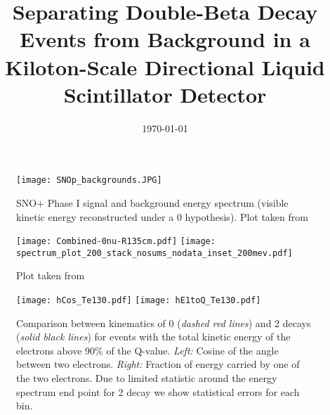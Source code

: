 



\graphicspath{{plots/}}

\linenumbers
{}

\title{Separating Double-Beta Decay Events from Background in a Kiloton-Scale Directional Liquid Scintillator Detector}


\begin{abstract}

\end{abstract}

\date{\today}

\maketitle

\newpage
\tableofcontents
\newpage

\linenumbers\relax %



\begin{figure}[ht]
  \centering
  \texttt{[image: SNOp\_backgrounds.JPG]}
  \caption{SNO+ Phase I signal and background energy spectrum (visible
    kinetic energy reconstructed under a 0{\nbb} hypothesis). Plot                                                                                                                   
    taken from~\cite{SNOp_paper}}
  \label{fig:SNOp_bkgs}
\end{figure}



\begin{figure}[ht]
  \centering
  \texttt{[image: Combined-0nu-R135cm.pdf]}
  \texttt{[image: spectrum\_plot\_200\_stack\_nosums\_nodata\_inset\_200mev.pdf]}
   \caption{ Plot taken from~\cite{SNOp_paper}}
  \label{fig:SNOp_and_KamLAND_bkgs}
\end{figure}

\begin{figure*}[ht]
  \centering
  \texttt{[image: hCos\_Te130.pdf]}
  \texttt{[image: hE1toQ\_Te130.pdf]}
  \caption{Comparison between kinematics of 0{\nbb} (\emph{dashed red
      lines}) and 2{\nbb} decays (\emph{solid black lines}) for events
    with the total kinetic energy of the electrons above 90\% of the
    Q-value. \emph{Left:} Cosine of the angle between two
    electrons. \emph{Right:} Fraction of energy carried by one of the
    two electrons. Due to limited statistic around the energy spectrum
    end point for 2{\nbb} decay we show statistical errors for each
    bin.}
  \label{fig:Kinematics}
\end{figure*}

